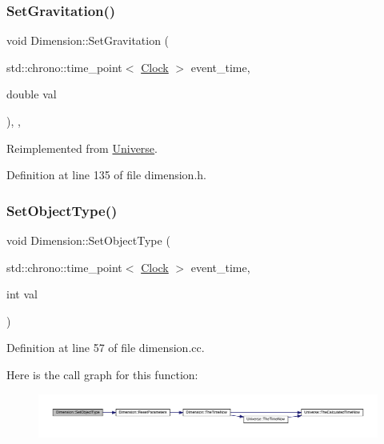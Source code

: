 \mbox{\label{class_dimension_aeec6887382d09e3d78382582ff4e7c33}} 
\subsubsection{\texorpdfstring{Set\+Gravitation()}{SetGravitation()}}
{\footnotesize\ttfamily void Dimension\+::\+Set\+Gravitation (\begin{DoxyParamCaption}\item[{std\+::chrono\+::time\+\_\+point$<$ \hyperlink{universe_8h_a0ef8d951d1ca5ab3cfaf7ab4c7a6fd80}{Clock} $>$}]{event\+\_\+time,  }\item[{double}]{val }\end{DoxyParamCaption})\hspace{0.3cm}{\ttfamily [inline]}, {\ttfamily [final]}, {\ttfamily [virtual]}}



Reimplemented from \hyperlink{class_universe_ae0cb8d86b2fbb8396d605160344b42f5}{Universe}.



Definition at line 135 of file dimension.\+h.

\mbox{\label{class_dimension_a484621a7c6f9b43f6e251ba04e0fdf8b}} 
\subsubsection{\texorpdfstring{Set\+Object\+Type()}{SetObjectType()}}
{\footnotesize\ttfamily void Dimension\+::\+Set\+Object\+Type (\begin{DoxyParamCaption}\item[{std\+::chrono\+::time\+\_\+point$<$ \hyperlink{universe_8h_a0ef8d951d1ca5ab3cfaf7ab4c7a6fd80}{Clock} $>$}]{event\+\_\+time,  }\item[{int}]{val }\end{DoxyParamCaption})}



Definition at line 57 of file dimension.\+cc.

Here is the call graph for this function\+:
\nopagebreak
\begin{figure}[H]
\begin{center}
\leavevmode
\includegraphics[width=350pt]{class_dimension_a484621a7c6f9b43f6e251ba04e0fdf8b_cgraph}
\end{center}
\end{figure}
\mbox{\label{class_dimension_af74dd7af3af95c0a51b001b6ad665300}} 
